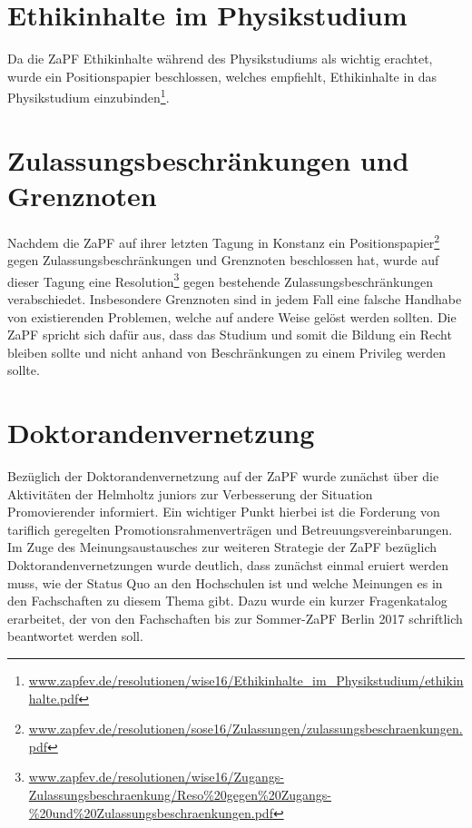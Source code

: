 \section*{Ethikinhalte im Physikstudium}
Da die ZaPF Ethikinhalte während des Physikstudiums als wichtig erachtet, wurde ein Positionspapier beschlossen, welches empfiehlt, Ethikinhalte in das 
Physikstudium einzubinden\footnote{\href{https://zapfev.de/resolutionen/wise16/Ethikinhalte_im_Physikstudium/ethikinhalte.pdf}{\url{www.zapfev.de/resolutionen/wise16/Ethikinhalte_im_Physikstudium/ethikinhalte.pdf}}}.

\section*{Zulassungsbeschränkungen und Grenznoten}
Nachdem  die ZaPF auf ihrer letzten Tagung in Konstanz ein Positionspapier\footnote{\href{https://zapfev.de/resolutionen/sose16/Zulassungen/zulassungsbeschraenkungen.pdf}{\url{www.zapfev.de/resolutionen/sose16/Zulassungen/zulassungsbeschraenkungen.pdf}}} 
gegen Zulassungsbeschränkungen und Grenznoten beschlossen hat, wurde auf dieser Tagung eine Resolution\footnote{\href{https://zapfev.de/resolutionen/wise16/Zugangs-Zulassungsbeschraenkung/Reso\%20gegen\%20Zugangs-\%20und\%20Zulassungsbeschraenkungen.pdf}{\url{www.zapfev.de/resolutionen/wise16/Zugangs-Zulassungsbeschraenkung/Reso\%20gegen\%20Zugangs-\%20und\%20Zulassungsbeschraenkungen.pdf}}} 
gegen bestehende Zulassungsbeschränkungen verabschiedet. Insbesondere Grenznoten sind in jedem Fall eine falsche Handhabe von existierenden  Problemen, welche auf 
andere Weise gelöst werden sollten. Die ZaPF spricht sich dafür aus, dass das Studium und somit die Bildung ein Recht bleiben sollte und nicht anhand von 
Beschränkungen zu einem Privileg werden sollte.
		
\section*{Doktorandenvernetzung}
Bezüglich der Doktorandenvernetzung auf der ZaPF wurde zunächst über die Aktivitäten der Helmholtz juniors zur Verbesserung der Situation Promovierender informiert. 
Ein wichtiger Punkt hierbei ist die Forderung von tariflich geregelten Promotionsrahmenverträgen und  Betreuungsvereinbarungen. \\
Im Zuge des Meinungsaustausches zur weiteren Strategie der ZaPF bezüglich Doktorandenvernetzungen wurde deutlich, dass zunächst einmal eruiert werden muss, wie der 
Status Quo an den Hochschulen ist und welche Meinungen es in den Fachschaften zu diesem Thema gibt. Dazu wurde ein kurzer Fragenkatalog erarbeitet, der von den 
Fachschaften bis zur Sommer-ZaPF Berlin 2017 schriftlich beantwortet werden soll. 
		
